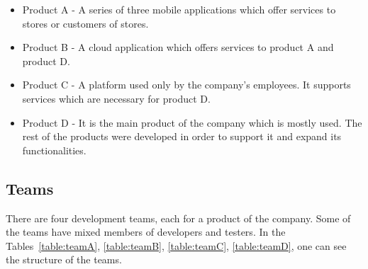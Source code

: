 \begin{itemize}
\item Product A - A series of three mobile applications which offer services to stores or customers of stores.
\item Product B - A cloud application which offers services to product A and product D.
\item Product C - A platform used only by the company's employees. It supports services which are necessary for product D.
\item Product D - It is the main product of the company which is mostly used. The rest of the products were developed in order to support it and expand its functionalities.

\end{itemize}

\subsection{Teams}
There are four development teams, each for a product of the company. Some of the teams have mixed members of developers and testers. In the Tables~\ref{table:teamA}, \ref{table:teamB}, \ref{table:teamC}, \ref{table:teamD}, one can see the structure of the teams. \\

